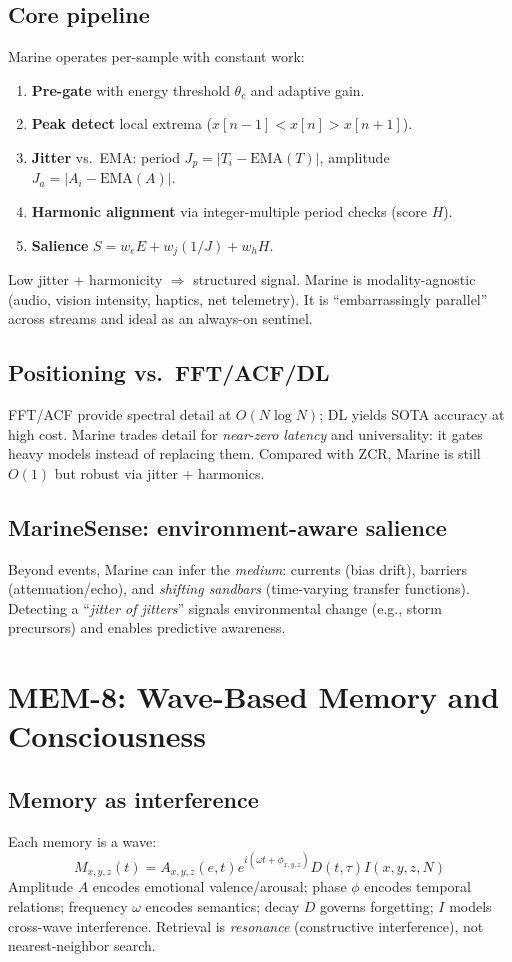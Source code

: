 \documentclass[conference]{IEEEtran}
\begin{document}
\subsection{Core pipeline}
Marine operates per-sample with constant work:
\begin{enumerate}[leftmargin=*]
\item \textbf{Pre-gate} with energy threshold $\theta_c$ and adaptive gain.
\item \textbf{Peak detect} local extrema ($x[n\!-\!1]\!<\!x[n]\!>\!x[n\!+\!1]$).
\item \textbf{Jitter} vs.\ EMA: period $J_p=\lvert T_i-\mathrm{EMA}(T)\rvert$, amplitude $J_a=\lvert A_i-\mathrm{EMA}(A)\rvert$.
\item \textbf{Harmonic alignment} via integer-multiple period checks (score $H$).
\item \textbf{Salience} $S=w_eE+w_j(1/J)+w_hH$.
\end{enumerate}
Low jitter + harmonicity $\Rightarrow$ structured signal. Marine is modality-agnostic (audio, vision intensity, haptics, net telemetry). It is ``embarrassingly parallel'' across streams and ideal as an always-on sentinel.

\subsection{Positioning vs.\ FFT/ACF/DL}
FFT/ACF provide spectral detail at $O(N\log N)$; DL yields SOTA accuracy at high cost. Marine trades detail for \emph{near-zero latency} and universality: it gates heavy models instead of replacing them. Compared with ZCR, Marine is still $O(1)$ but robust via jitter + harmonics.

\subsection{MarineSense: environment-aware salience}
Beyond events, Marine can infer the \emph{medium}: currents (bias drift), barriers (attenuation/echo), and \emph{shifting sandbars} (time-varying transfer functions). Detecting a ``\emph{jitter of jitters}'' signals environmental change (e.g., storm precursors) and enables predictive awareness.

\section{MEM-8: Wave-Based Memory and Consciousness}
\subsection{Memory as interference}
Each memory is a wave:
\[
M_{x,y,z}(t)=A_{x,y,z}(e,t)e^{i(\omega t+\phi_{x,y,z})}D(t,\tau)I(x,y,z,N)
\]
Amplitude $A$ encodes emotional valence/arousal; phase $\phi$ encodes temporal relations; frequency $\omega$ encodes semantics; decay $D$ governs forgetting; $I$ models cross-wave interference. Retrieval is \emph{resonance} (constructive interference), not nearest-neighbor search.
\end{document}
